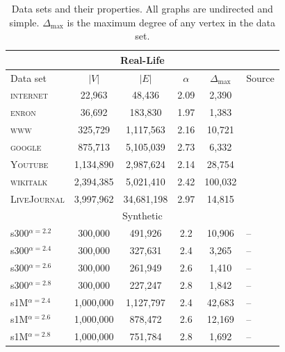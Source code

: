 \begin{table}[!ht]
\centering
\small
\begin{tabular}{lccccl}\hline
\multicolumn{6}{c}{Real-Life}\\\hline
Data set  & $\vert V \vert$ & $\vert E\vert$ & $\alpha$  & $\Delta_{\max}$ & Source\\\hline
\textsc{internet} &  22,963        &    48,436      & 2.09     & 2,390        & \cite{newman}\\
\textsc{enron}    &  36,692        &   183,830      & 1.97    &1,383         & \cite{leskovec2009community}\\
\textsc{www}      & 325,729        & 1,117,563     & 2.16 & 10,721            & \cite{albert1999internet}\\
\textsc{google} & 875,713 & 5,105,039 & 2.73 & 6,332 & \cite{leskovec2009community}\\
\textsc{Youtube} & 1,134,890 & 2,987,624 & 2.14 & 28,754 & \cite{yang2015defining}\\
\textsc{wikitalk} & 2,394,385 & 5,021,410 & 2.42 & 100,032 & \cite{leskovec2010predicting}\\
\textsc{LiveJournal} &  3,997,962        &    34,681,198      & 2.97     & 14,815        & \cite{yang2015defining}\\\hline


\multicolumn{6}{c}{Synthetic}\\\hline
s300$^{\alpha=2.2}$    & 300,000        & 491,926        & 2.2    & 10,906 & --\\
s300$^{\alpha=2.4}$    & 300,000        & 327,631        & 2.4    & 3,265 & --\\
s300$^{\alpha=2.6}$    & 300,000        & 261,949        & 2.6    & 1,410 & --\\
s300$^{\alpha=2.8}$    & 300,000        & 227,247        & 2.8    & 1,842 & --\\
s1M$^{\alpha=2.4}$    & 1,000,000       & 1,127,797      & 2.4    & 42,683 &-- \\
s1M$^{\alpha=2.6}$    & 1,000,000       & 878,472        & 2.6    & 12,169 &-- \\
s1M$^{\alpha=2.8}$    & 1,000,000       & 751,784         & 2.8   & 1,692  &-- \\\hline
\end{tabular}
\caption{Data sets and their properties. All graphs are undirected and simple. $\Delta_{\max}$ is the maximum degree of any vertex in the data set.}
\label{t:datasets}
\end{table}


